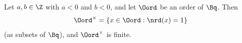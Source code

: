 Let $a,b\in\Z$ with $a<0$ and $b<0$, and let $\Oord$ be an order of $\Bq$. Then
\[
  \Oord^\times=\{x\in\Oord:\nrd(x)=1\}
\]
(as subsets of $\Bq$), and $\Oord^\times$ is finite.

